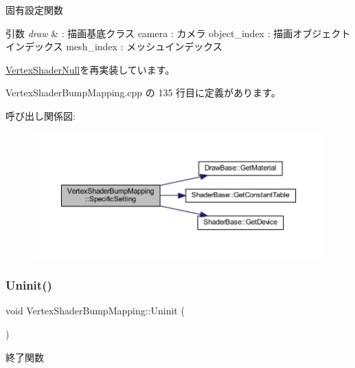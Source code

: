 固有設定関数 


\begin{DoxyParams}{引数}
{\em draw} & \+: 描画基底クラス camera \+: カメラ object\+\_\+index \+: 描画オブジェクトインデックス mesh\+\_\+index \+: メッシュインデックス \\
\hline
\end{DoxyParams}


\mbox{\hyperlink{class_vertex_shader_null_aa2234c6ea083e3c0233d59f222145992}{Vertex\+Shader\+Null}}を再実装しています。



 Vertex\+Shader\+Bump\+Mapping.\+cpp の 135 行目に定義があります。

呼び出し関係図\+:\nopagebreak
\begin{figure}[H]
\begin{center}
\leavevmode
\includegraphics[width=350pt]{class_vertex_shader_bump_mapping_ad81d57336763441c4071f967b57dbce1_cgraph}
\end{center}
\end{figure}
\mbox{\label{class_vertex_shader_bump_mapping_abed4e0aa9655fa7a7a21e03d00e7c0e5}} 
\subsubsection{\texorpdfstring{Uninit()}{Uninit()}}
{\footnotesize\ttfamily void Vertex\+Shader\+Bump\+Mapping\+::\+Uninit (\begin{DoxyParamCaption}{ }\end{DoxyParamCaption})\hspace{0.3cm}{\ttfamily [virtual]}}



終了関数 



